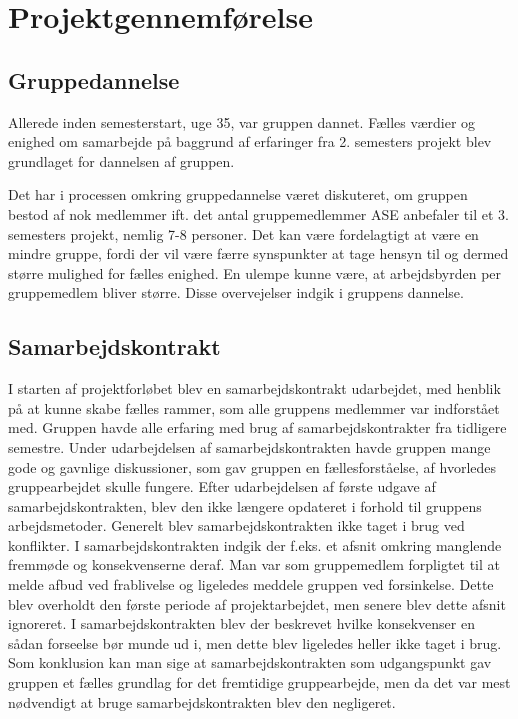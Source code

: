 \chapter{Projektgennemførelse}
\section{Gruppedannelse}
Allerede inden semesterstart, uge 35, var gruppen dannet. Fælles værdier og enighed om samarbejde på baggrund af erfaringer fra 2. semesters projekt blev 
grundlaget for dannelsen af gruppen.

Det har i processen omkring gruppedannelse været diskuteret, om gruppen bestod af nok medlemmer ift. det antal gruppemedlemmer ASE anbefaler til et 
3. semesters projekt, nemlig 7-8 personer. Det kan være fordelagtigt at være en mindre gruppe, fordi der vil være færre synspunkter at tage hensyn til og 
dermed større mulighed for fælles enighed. En ulempe kunne være, at arbejdsbyrden per gruppemedlem bliver større. Disse overvejelser indgik i gruppens dannelse.\\

\section{Samarbejdskontrakt}
I starten af projektforløbet blev en samarbejdskontrakt udarbejdet, med henblik på at kunne skabe fælles rammer, som alle gruppens medlemmer var indforstået
 med. Gruppen havde alle erfaring med brug af samarbejdskontrakter fra tidligere semestre. Under udarbejdelsen af samarbejdskontrakten havde gruppen mange gode og gavnlige diskussioner, som gav gruppen en 
 fællesforståelse, af hvorledes gruppearbejdet skulle fungere. Efter udarbejdelsen af første udgave af samarbejdskontrakten, blev den ikke længere opdateret i 
 forhold til gruppens arbejdsmetoder. Generelt blev samarbejdskontrakten ikke taget i brug ved konflikter. I samarbejdskontrakten indgik der f.eks. et afsnit 
 omkring manglende fremmøde og konsekvenserne deraf. Man var som gruppemedlem forpligtet til at melde afbud ved frablivelse og ligeledes meddele gruppen ved 
 forsinkelse. Dette blev overholdt den første periode af projektarbejdet, men senere blev dette afsnit ignoreret. I samarbejdskontrakten blev der beskrevet 
 hvilke konsekvenser en sådan forseelse bør munde ud i, men dette blev ligeledes heller ikke taget i brug. Som konklusion kan man sige at samarbejdskontrakten 
 som udgangspunkt gav gruppen et fælles grundlag for det fremtidige gruppearbejde, men da det var mest nødvendigt at bruge samarbejdskontrakten blev den 
 negligeret.
 
